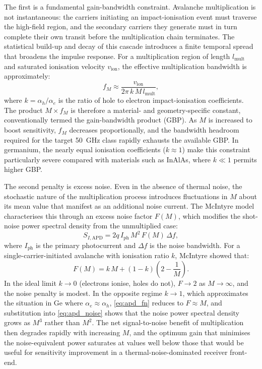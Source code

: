 The first is a fundamental gain-bandwidth constraint. Avalanche multiplication
is not instantaneous: the carriers initiating an impact-ionisation event must
traverse the high-field region, and the secondary carriers they generate
must in turn complete their own transit before the multiplication chain
terminates. The statistical build-up and decay of this cascade introduces
a finite temporal spread that broadens the impulse response. For a multiplication
region of length $l_{\mathrm{mult}}$ and saturated ionisation velocity
$v_{\mathrm{ion}}$, the effective multiplication bandwidth is approximately:
\begin{equation}
    f_M \approx \frac{v_{\mathrm{ion}}}{2\pi\,k\,M\,l_{\mathrm{mult}}},
    \label{eq:apd_gbp}
\end{equation}
where $k = \alpha_h/\alpha_e$ is the ratio of hole to electron impact-ionisation
coefficients. The product $M\times f_M$ is therefore a material- and
geometry-specific constant, conventionally termed the gain-bandwidth product
(GBP). As $M$ is increased to boost sensitivity, $f_M$ decreases
proportionally, and the bandwidth headroom required for the target
\SI{50}{\giga\hertz} class rapidly exhausts the available GBP. In germanium,
the nearly equal ionisation coefficients ($k\approx 1$) make this constraint
particularly severe compared with materials such as InAlAs, where $k\ll 1$
permits higher GBP.

The second penalty is excess noise. Even in the absence of thermal noise,
the stochastic nature of the multiplication process introduces fluctuations
in $M$ about its mean value that manifest as an additional noise current.
The McIntyre model~\cite{McIntyre1966} characterises this through an
excess noise factor $F(M)$, which modifies the shot-noise power spectral
density from the unmultiplied case:
\begin{equation}
    S_{I,\mathrm{APD}} = 2q\,I_{\mathrm{ph}}\,M^2\,F(M)\,\Delta f,
    \label{eq:apd_noise}
\end{equation}
where $I_{\mathrm{ph}}$ is the primary photocurrent and $\Delta f$ is the
noise bandwidth. For a single-carrier-initiated avalanche with ionisation
ratio $k$, McIntyre showed that:
\begin{equation}
    F(M) = k\,M + (1-k)\!\left(2 - \frac{1}{M}\right).
    \label{eq:apd_fn}
\end{equation}
In the ideal limit $k\rightarrow 0$ (electrons ionise, holes do not),
$F\rightarrow 2$ as $M\rightarrow\infty$, and the noise penalty is modest.
In the opposite regime $k\rightarrow 1$, which approximates the situation
in Ge where $\alpha_e\approx\alpha_h$, \cref{eq:apd_fn} reduces to
$F\approx M$, and substitution into \cref{eq:apd_noise} shows that the
noise power spectral density grows as $M^3$ rather than $M^2$. The
net signal-to-noise benefit of multiplication then degrades rapidly with
increasing $M$, and the optimum gain that minimises the noise-equivalent
power saturates at values well below those that would be useful for
sensitivity improvement in a thermal-noise-dominated receiver front-end.


